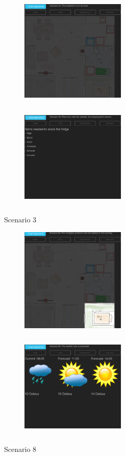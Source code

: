 \begin{figure}[ht]
\centering
\begin{subfigure}{0.32\textwidth}
\includegraphics[width=5cm, height=5cm]{fig/scenario3a}
\caption{}
\label{fig:3a}
\end{subfigure}
\begin{subfigure}{0.32\textwidth}
\includegraphics[width=5cm, height=5cm]{fig/scenario3b}
\caption{}
\label{fig:3b}
\end{subfigure}
\caption{Scenario 3}
\label{fig:scenario3}
\end{figure}

\begin{figure}[ht]
\centering
\begin{subfigure}{0.32\textwidth}
\includegraphics[width=5cm, height=5cm]{fig/scenario8a}
\caption{}
\label{fig:8a}
\end{subfigure}
\begin{subfigure}{0.32\textwidth}
\includegraphics[width=5cm, height=5cm]{fig/scenario8b}
\caption{}
\label{fig:8b}
\end{subfigure}
\caption{Scenario 8}
\label{fig:scenario8}
\end{figure}




